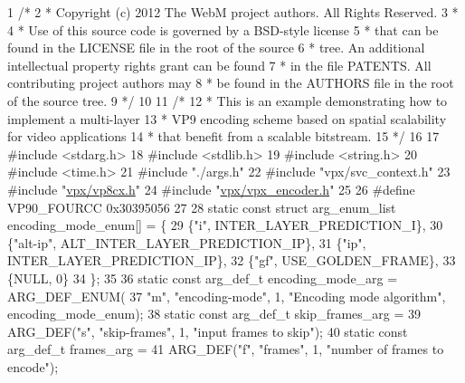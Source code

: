 \begin{DoxyCodeInclude}
1 \textcolor{comment}{/*}
2 \textcolor{comment}{ *  Copyright (c) 2012 The WebM project authors. All Rights Reserved.}
3 \textcolor{comment}{ *}
4 \textcolor{comment}{ *  Use of this source code is governed by a BSD-style license}
5 \textcolor{comment}{ *  that can be found in the LICENSE file in the root of the source}
6 \textcolor{comment}{ *  tree. An additional intellectual property rights grant can be found}
7 \textcolor{comment}{ *  in the file PATENTS.  All contributing project authors may}
8 \textcolor{comment}{ *  be found in the AUTHORS file in the root of the source tree.}
9 \textcolor{comment}{ */}
10 
11 \textcolor{comment}{/*}
12 \textcolor{comment}{ * This is an example demonstrating how to implement a multi-layer}
13 \textcolor{comment}{ * VP9 encoding scheme based on spatial scalability for video applications}
14 \textcolor{comment}{ * that benefit from a scalable bitstream.}
15 \textcolor{comment}{ */}
16 
17 \textcolor{preprocessor}{#include <stdarg.h>}
18 \textcolor{preprocessor}{#include <stdlib.h>}
19 \textcolor{preprocessor}{#include <string.h>}
20 \textcolor{preprocessor}{#include <time.h>}
21 \textcolor{preprocessor}{#include "./args.h"}
22 \textcolor{preprocessor}{#include "vpx/svc\_context.h"}
23 \textcolor{preprocessor}{#include "\hyperlink{vp8cx_8h}{vpx/vp8cx.h}"}
24 \textcolor{preprocessor}{#include "\hyperlink{vpx__encoder_8h}{vpx/vpx\_encoder.h}"}
25 
26 \textcolor{preprocessor}{#define VP90\_FOURCC 0x30395056}
27 
28 \textcolor{keyword}{static} \textcolor{keyword}{const} \textcolor{keyword}{struct }arg\_enum\_list encoding\_mode\_enum[] = \{
29   \{\textcolor{stringliteral}{"i"}, INTER\_LAYER\_PREDICTION\_I\},
30   \{\textcolor{stringliteral}{"alt-ip"}, ALT\_INTER\_LAYER\_PREDICTION\_IP\},
31   \{\textcolor{stringliteral}{"ip"}, INTER\_LAYER\_PREDICTION\_IP\},
32   \{\textcolor{stringliteral}{"gf"}, USE\_GOLDEN\_FRAME\},
33   \{NULL, 0\}
34 \};
35 
36 \textcolor{keyword}{static} \textcolor{keyword}{const} arg\_def\_t encoding\_mode\_arg = ARG\_DEF\_ENUM(
37     \textcolor{stringliteral}{"m"}, \textcolor{stringliteral}{"encoding-mode"}, 1, \textcolor{stringliteral}{"Encoding mode algorithm"}, encoding\_mode\_enum);
38 \textcolor{keyword}{static} \textcolor{keyword}{const} arg\_def\_t skip\_frames\_arg =
39     ARG\_DEF(\textcolor{stringliteral}{"s"}, \textcolor{stringliteral}{"skip-frames"}, 1, \textcolor{stringliteral}{"input frames to skip"});
40 \textcolor{keyword}{static} \textcolor{keyword}{const} arg\_def\_t frames\_arg =
41     ARG\_DEF(\textcolor{stringliteral}{"f"}, \textcolor{stringliteral}{"frames"}, 1, \textcolor{stringliteral}{"number of frames to encode"});

\end{DoxyCodeInclude}
